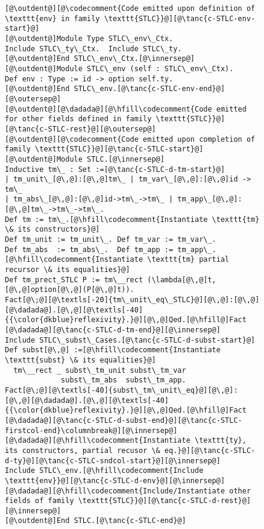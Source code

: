 \begin{figure}
\begin{minipage}{\textwidth}
\begin{multicols}{2}
\begin{lstlisting}
[@\outdent@][@\codecomment{Code emitted upon definition of \texttt{env} in family \texttt{STLC}}@][@\tanc{c-STLC-env-start}@]
[@\outdent@]Module Type STLC\_env\_Ctx.
Include STLC\_ty\_Ctx.  Include STLC\_ty.
[@\outdent@]End STLC\_env\_Ctx.[@\innersep@]
[@\outdent@]Module STLC\_env (self : STLC\_env\_Ctx).
Def env : Type := id -> option self.ty.
[@\outdent@]End STLC\_env.[@\tanc{c-STLC-env-end}@][@\outersep@]
[@\outdent@][@\dadada@][@\hfill\codecomment{Code emitted for other fields defined in family \texttt{STLC}}@][@\tanc{c-STLC-rest}@][@\outersep@]
[@\outdent@][@\codecomment{Code emitted upon completion of family \texttt{STLC}}@][@\tanc{c-STLC-start}@]
[@\outdent@]Module STLC.[@\innersep@]
Inductive tm\_ : Set :=[@\tanc{c-STLC-d-tm-start}@]
| tm_unit\_[@\,@]:[@\,@]tm\_ | tm_var\_[@\,@]:[@\,@]id -> tm\_
| tm_abs\_[@\,@]:[@\,@]id->tm\_->tm\_ | tm_app\_[@\,@]:[@\,@]tm\_->tm\_->tm\_.
Def tm := tm\_.[@\hfill\codecomment{Instantiate \texttt{tm} \& its constructors}@]
Def tm_unit := tm_unit\_. Def tm_var := tm_var\_.
Def tm_abs  := tm_abs\_.  Def tm_app := tm_app\_.
[@\hfill\codecomment{Instantiate \texttt{tm} partial recursor \& its equalities}@]
Def tm_prect_STLC P := tm\__rect (\lambda[@\,@]t,[@\,@]option[@\,@](P[@\,@]t)).
Fact[@\;@][@\textls[-20]{tm\_unit\_eq\_STLC}@][@\,@]:[@\,@][@\dadada@].[@\,@][@\textls[-40]{{\color{dkblue}reflexivity}.}@][@\,@]Qed.[@\hfill@]Fact [@\dadada@][@\tanc{c-STLC-d-tm-end}@][@\innersep@]
Include STLC\_subst\_Cases.[@\tanc{c-STLC-d-subst-start}@]
Def subst[@\,@] :=[@\hfill\codecomment{Instantiate \texttt{subst} \& its equalities}@]
  tm\__rect _ subst\_tm_unit subst\_tm_var
             subst\_tm_abs  subst\_tm_app.
Fact[@\;@][@\textls[-40]{subst\_tm\_unit\_eq}@][@\,@]:[@\,@][@\dadada@].[@\,@][@\textls[-40]{{\color{dkblue}reflexivity}.}@][@\,@]Qed.[@\hfill@]Fact [@\dadada@][@\tanc{c-STLC-d-subst-end}@][@\tanc{c-STLC-firstcol-end}\columnbreak@][@\innersep@]
[@\dadada@][@\hfill\codecomment{Instantiate \texttt{ty}, its constructors, partial recusor \& eq.}@][@\tanc{c-STLC-d-ty}@][@\tanc{c-STLC-sndcol-start}@][@\innersep@]
Include STLC\_env.[@\hfill\codecomment{Include \texttt{env}}@][@\tanc{c-STLC-d-env}@][@\innersep@]
[@\dadada@][@\hfill\codecomment{Include/Instantiate other fields of family \texttt{STLC}}@][@\tanc{c-STLC-d-rest}@][@\innersep@]
[@\outdent@]End STLC.[@\tanc{c-STLC-end}@]
\end{lstlisting}


\end{multicols}
\end{minipage}
\end{figure}

